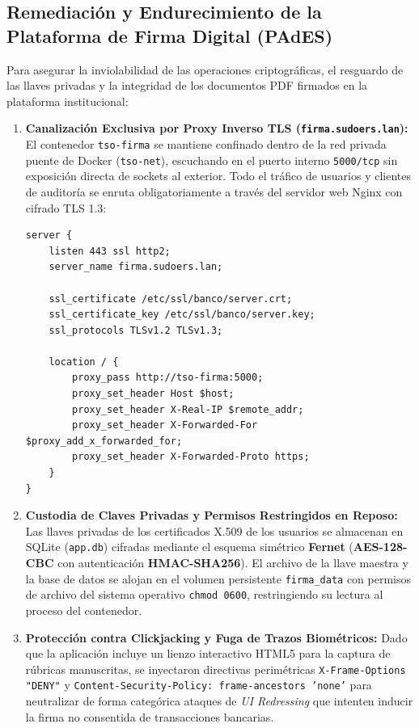 \subsection{Remediación y Endurecimiento de la Plataforma de Firma Digital (PAdES)}

Para asegurar la inviolabilidad de las operaciones criptográficas, el resguardo de las llaves privadas y la integridad de los documentos PDF firmados en la plataforma institucional:

\begin{enumerate}
  \item \textbf{Canalización Exclusiva por Proxy Inverso TLS (\texttt{firma.sudoers.lan}):}
  El contenedor \texttt{tso-firma} se mantiene confinado dentro de la red privada puente de Docker (\texttt{tso-net}), escuchando en el puerto interno \texttt{5000/tcp} sin exposición directa de sockets al exterior. Todo el tráfico de usuarios y clientes de auditoría se enruta obligatoriamente a través del servidor web Nginx con cifrado TLS 1.3:
\begin{lstlisting}[style=terminal, caption={Configuracion de Proxy Inverso Seguro para Firma Digital en Nginx}, label={lst:nginx-firma-conf}]
server {
    listen 443 ssl http2;
    server_name firma.sudoers.lan;

    ssl_certificate /etc/ssl/banco/server.crt;
    ssl_certificate_key /etc/ssl/banco/server.key;
    ssl_protocols TLSv1.2 TLSv1.3;

    location / {
        proxy_pass http://tso-firma:5000;
        proxy_set_header Host $host;
        proxy_set_header X-Real-IP $remote_addr;
        proxy_set_header X-Forwarded-For $proxy_add_x_forwarded_for;
        proxy_set_header X-Forwarded-Proto https;
    }
}
\end{lstlisting}

  \item \textbf{Custodia de Claves Privadas y Permisos Restringidos en Reposo:}
  Las llaves privadas de los certificados X.509 de los usuarios se almacenan en SQLite (\texttt{app.db}) cifradas mediante el esquema simétrico \textbf{Fernet} (\textbf{AES-128-CBC} con autenticación \textbf{HMAC-SHA256}). El archivo de la llave maestra y la base de datos se alojan en el volumen persistente \texttt{firma\_data} con permisos de archivo del sistema operativo \texttt{chmod 0600}, restringiendo su lectura al proceso del contenedor.

  \item \textbf{Protección contra Clickjacking y Fuga de Trazos Biométricos:}
  Dado que la aplicación incluye un lienzo interactivo HTML5 para la captura de rúbricas manuscritas, se inyectaron directivas perimétricas \texttt{X-Frame-Options "DENY"} y \texttt{Content-Security-Policy: frame-ancestors 'none'} para neutralizar de forma categórica ataques de \textit{UI Redressing} que intenten inducir la firma no consentida de transacciones bancarias.
\end{enumerate}
